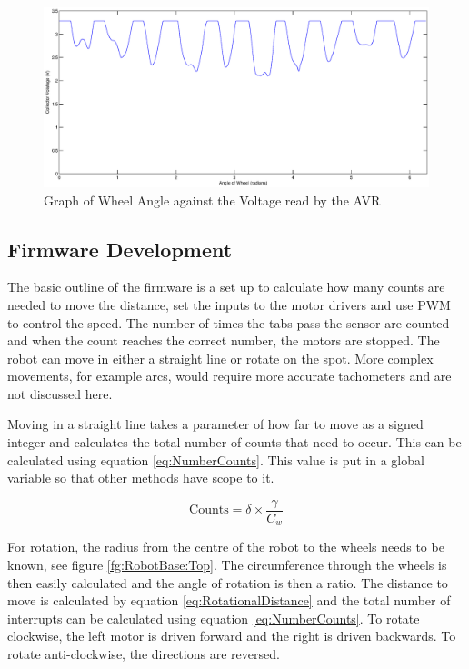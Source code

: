 \begin{figure}
\includegraphics[width = \textwidth]{Figures/WheelVoltageGraph.eps}
\caption{Graph of Wheel Angle against the Voltage read by the AVR}
\label{Graph:WheelVoltage}
\end{figure}
 

\subsection{Firmware Development}

The basic outline of the firmware is a set up to calculate how many counts are needed to move the distance, set the inputs to the motor drivers and use PWM to control the speed. The number of times the tabs pass the sensor are counted and when the count reaches the correct number, the motors are stopped. The robot can move in either a straight line or rotate on the spot. More complex movements, for example arcs, would require more accurate tachometers and are not discussed here. 

Moving in a straight line takes a parameter of how far to move as a signed integer and calculates the total number of counts that need to occur. This can be calculated using equation \eqref{eq:NumberCounts}. This value is put in a global variable so that other methods have scope to it. 

\begin{equation}
\label{eq:NumberCounts}
\text{Counts} = \delta \times \frac{\gamma}{C_w}
\end{equation}

For rotation, the radius from the centre of the robot to the wheels needs to be known, see figure \ref{fg:RobotBase:Top}. The circumference through the wheels is then easily calculated and the angle of rotation is then a ratio. The distance to move is calculated by equation \eqref{eq:RotationalDistance} and the total number of interrupts can be calculated using equation \eqref{eq:NumberCounts}. To rotate clockwise, the left motor is driven forward and the right is driven backwards. To rotate anti-clockwise, the directions are reversed.

